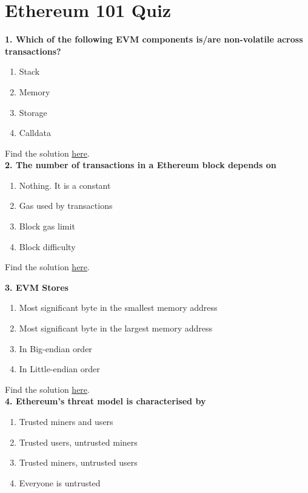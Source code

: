 \section{Ethereum 101 Quiz}

\textbf{1. Which of the following EVM components is/are non-volatile across transactions?}

\begin{enumerate}[label=\Alph*.]
    \item Stack
    \item Memory
    \item Storage
    \item Calldata
\end{enumerate}

Find the solution \hyperref[sec:exam1_q1]{here}.\\

\textbf{2. The number of transactions in a Ethereum block depends on}

\begin{enumerate}[label=\Alph*.]
    \item Nothing.
        It is a constant
    \item Gas used by transactions
    \item Block gas limit
    \item Block difficulty
\end{enumerate}

Find the solution \hyperref[sec:exam1_q2]{here}.\\

\pagebreak

\textbf{3. EVM Stores}

\begin{enumerate}[label=\Alph*.]
    \item Most significant byte in the smallest memory address
    \item Most significant byte in the largest memory address
    \item In Big-endian order
    \item In Little-endian order
\end{enumerate}

Find the solution \hyperref[sec:exam1_q3]{here}.\\

\textbf{4. Ethereum's threat model is characterised by}

\begin{enumerate}[label=\Alph*.]
    \item Trusted miners and users
    \item Trusted users, untrusted miners
    \item Trusted miners, untrusted users
    \item Everyone is untrusted
\end{enumerate}


